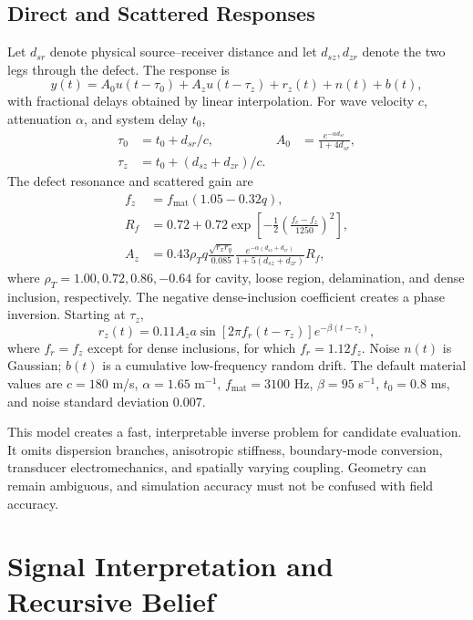 \documentclass[conference]{IEEEtran}
\begin{document}
\subsection{Direct and Scattered Responses}
Let $d_{sr}$ denote physical source--receiver distance and let $d_{sz},d_{zr}$ denote the two legs through the defect. The response is
\begin{equation}
 y(t)=A_0u(t-\tau_0)+A_zu(t-\tau_z)+r_z(t)+n(t)+b(t),
 \label{eq:forward}
\end{equation}
with fractional delays obtained by linear interpolation. For wave velocity $c$, attenuation $\alpha$, and system delay $t_0$,
\begin{align}
 \tau_0 &= t_0+d_{sr}/c,& A_0&=\frac{e^{-\alpha d_{sr}}}{1+4d_{sr}},\\
 \tau_z &= t_0+(d_{sz}+d_{zr})/c.&
\end{align}
The defect resonance and scattered gain are
\begin{align}
 f_z &= f_{\mathrm{mat}}(1.05-0.32q),\\
 R_f &=0.72+0.72\exp\!\left[-\frac{1}{2}
 \left(\frac{f_c-f_z}{1250}\right)^2\right],\\
 A_z &=0.43\rho_Tq\frac{\sqrt{r_xr_y}}{0.085}
 \frac{e^{-\alpha(d_{sz}+d_{zr})}}{1+5(d_{sz}+d_{zr})}R_f,
 \label{eq:scatter}
\end{align}
where $\rho_T=1.00,0.72,0.86,-0.64$ for cavity, loose region, delamination, and dense inclusion, respectively. The negative dense-inclusion coefficient creates a phase inversion. Starting at $\tau_z$,
\begin{equation}
 r_z(t)=0.11 A_z a\sin[2\pi f_r(t-\tau_z)]e^{-\beta(t-\tau_z)},
\end{equation}
where $f_r=f_z$ except for dense inclusions, for which $f_r=1.12f_z$. Noise $n(t)$ is Gaussian; $b(t)$ is a cumulative low-frequency random drift. The default material values are $c=180$ m/s, $\alpha=1.65$ m$^{-1}$, $f_{\mathrm{mat}}=3100$ Hz, $\beta=95$ s$^{-1}$, $t_0=0.8$ ms, and noise standard deviation 0.007.

This model creates a fast, interpretable inverse problem for candidate evaluation. It omits dispersion branches, anisotropic stiffness, boundary-mode conversion, transducer electromechanics, and spatially varying coupling. Geometry can remain ambiguous, and simulation accuracy must not be confused with field accuracy.

\section{Signal Interpretation and Recursive Belief}
\end{document}
